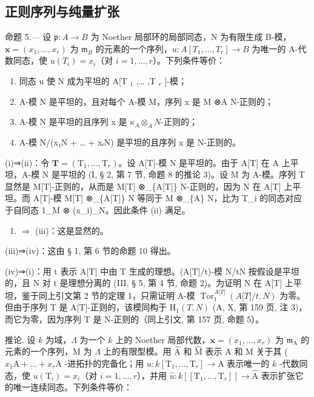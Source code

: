 \subsection{正则序列与纯量扩张}

命题 5.--- 设 \(\mathfrak{p}: A \to B\) 为 Noether 局部环的局部同态，N 为有限生成 B-模，\(\mathbf{x} = (x_1, \ldots, x_r)\) 为 \(\mathfrak{m}_B\) 的元素的一个序列，\(u: A[T_1, \ldots, T_r] \longrightarrow B\) 为唯一的 A-代数同态，使 \(u(T_i) = x_i\)（对 \(i = 1, \ldots, r\)）。下列条件等价：

\begin{enumerate}
\def\labelenumi{(\roman{enumi})}
\item
  同态 u 使 N 成为平坦的 A{[}T \(_{1}\) ,\ldots{} ,T \(_{r}\) {]}-模；
\item
  A-模 N 是平坦的，且对每个 A-模 M，序列 x 是 M ⊗A N-正则的；
\item
  A-模 N 是平坦的且序列 x 是 \(\kappa_{A} \otimes_{A} N\)-正则的；
\item
  A-模 N/(x₁N + \ldots{} + xᵣN) 是平坦的且序列 x 是 N-正则的。
\end{enumerate}

(i)⇒(ii)：令 \(\mathbf{T} = (\mathrm{T}_{1}, \ldots, \mathrm{T}_{r})\)。设 A{[}T{]}-模 N 是平坦的。由于 A{[}T{]} 在 A 上平坦，A-模 N 是平坦的 (I, § 2, 第 7 节, 命题 8 的推论 3)。设 M 为 A-模。序列 T 显然是 M{[}T{]}-正则的，从而是 M{[}T{]} ⊗\_\{A{[}T{]}\} N-正则的，因为 N 在 A{[}T{]} 上平坦。而 A{[}T{]}-模 M{[}T{]} ⊗\_\{A{[}T{]}\} N 等同于 M ⊗\_\{A\} N，比为 T\_i 的同态对应于自同态 1\_M ⊗ (x\_i)\_N。因此条件 (ii) 满足。

\begin{enumerate}
\def\labelenumi{(\roman{enumi})}
\setcounter{enumi}{1}
\tightlist
\item
  \(\Rightarrow\) (iii)：这是显然的。
\end{enumerate}

(iii)⇒(iv)：这由 § 1, 第 6 节的命题 10 得出。

(iv)⇒(i)：用 t 表示 A{[}T{]} 中由 T 生成的理想。(A{[}T{]}/t)-模 N/tN 按假设是平坦的，且 N 对 t 是理想分离的 (III, § 5, 第 4 节, 命题 2)。为证明 N 在 A{[}T{]} 上平坦，鉴于同上引文第 2 节的定理 1，只需证明 A-模 \(\operatorname{Tor}_{1}^{A{[}T{]}}(A{[}T{]}/t,N)\) 为零。但由于序列 T 是 A{[}T{]}-正则的，该模同构于 \(\mathrm{H}_{1}(T,N)\) (A, X, 第 159 页, 注 3)，而它为零，因为序列 T 是 N-正则的（同上引文, 第 157 页, 命题 5）。

推论. 设 \(k\) 为域，\(\Lambda\) 为一个 \(k\) 上的 Noether 局部代数，\(\mathbf{x} = (x_1, \ldots, x_r)\) 为 \(\mathfrak{m}_{\mathrm{A}}\) 的元素的一个序列，M 为 \(\Lambda\) 上的有限型模。用 \(\widehat{\mathrm{A}}\) 和 \(\widehat{\mathrm{M}}\) 表示 A 和 M 关于其 ( \(x_1\mathrm{A} + \ldots + x_r\mathrm{A}\) -进拓扑的完备化；用 \(u: k[\mathrm{T}_1, \ldots, \mathrm{T}_r] \longrightarrow \mathrm{A}\) 表示唯一的 \(k\) -代数同态，使 \(u(\mathrm{T}_i) = x_i\)（对 \(i = 1, \ldots, r\)），并用 \(\hat{u}: k[[\mathrm{T}_1, \ldots, \mathrm{T}_r]] \longrightarrow \widehat{\mathrm{A}}\) 表示扩张它的唯一连续同态。下列条件等价：

